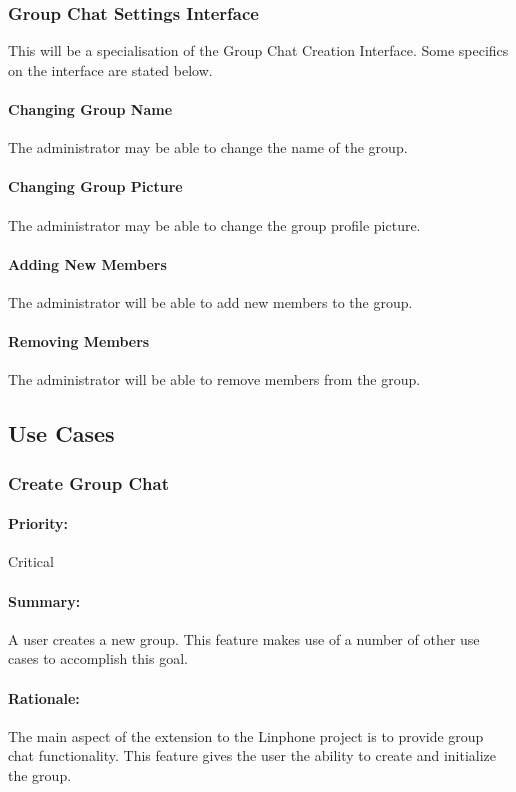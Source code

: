 \documentclass[11pt]{article}
\begin{document}
\subsubsection{Group Chat Settings Interface} This will be a specialisation of the Group Chat Creation Interface. Some specifics on the interface are stated below.
\paragraph{Changing Group Name} The administrator may be able to change the name of the group.
\paragraph{Changing Group Picture} The administrator may be able to change the group profile picture.
\paragraph{Adding New Members} The administrator will be able to add new members to the group.
\paragraph{Removing Members} The administrator will be able to remove  members from the group.

\newpage
\subsection{Use Cases}
\subsubsection{Create Group Chat} \label{UC-create-group}
\paragraph{Priority:}Critical
\paragraph{Summary:} A user creates a new group. This feature makes use of a number of other use cases to accomplish this goal.
\paragraph{Rationale:} The main aspect of the extension to the Linphone project is to provide group chat functionality. This feature gives the user the ability to create and initialize the group.
\end{document}
